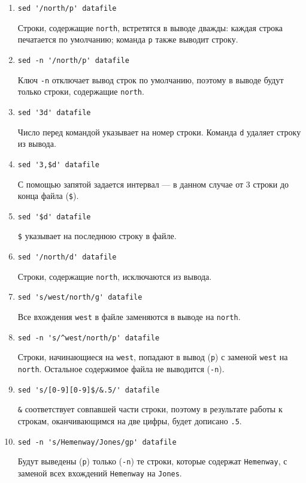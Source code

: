 \documentclass[listings]{labreport}
\begin{document}
\begin{enumerate}
\item \verb|sed '/north/p' datafile|

Строки, содержащие \verb|north|, встретятся в выводе дважды: каждая строка
печатается по умолчанию; команда \verb|p| также выводит строку.

\item \verb|sed -n '/north/p' datafile|

Ключ \verb|-n| отключает вывод строк по умолчанию, поэтому в выводе будут
только строки, содержащие \verb|north|.

\item \verb|sed '3d' datafile|

Число перед командой указывает на номер строки. Команда \verb|d| удаляет строку из вывода.

\item \verb|sed '3,$d' datafile|

С помощью запятой задается интервал — в данном случае от 3 строки до конца файла (\verb|$|).

\item \verb|sed '$d' datafile|

\verb|$| указывает на последнюю строку в файле.

\item \verb|sed '/north/d' datafile|

Строки, содержащие \verb|north|, исключаются из вывода.

\item \verb|sed 's/west/north/g' datafile|

Все вхождения \verb|west| в файле заменяются в выводе на \verb|north|.

\item \verb|sed -n 's/^west/north/p' datafile|

Строки, начинающиеся на \verb|west|, попадают в вывод (\verb|p|) с заменой \verb|west|
на \verb|north|. Остальное содержимое файла не выводится (\verb|-n|).

\item \verb|sed 's/[0-9][0-9]$/&.5/' datafile|

\verb|&| соответствует совпавшей части строки, поэтому в результате работы к строкам,
оканчивающимся на две цифры, будет дописано \verb|.5|.

\item \verb|sed -n 's/Hemenway/Jones/gp' datafile|

Будут выведены (\verb|p|) только (\verb|-n|) те строки, которые содержат \verb|Hemenway|,
с заменой всех вхождений \verb|Hemenway| на \verb|Jones|.


\end{enumerate}
\end{document}
